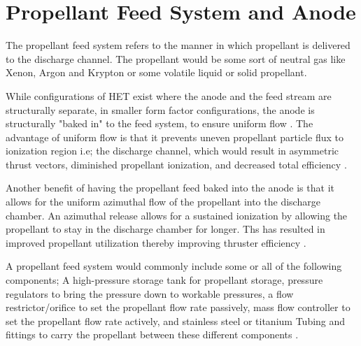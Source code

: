 \section{Propellant Feed System and Anode}

The propellant feed system refers to the manner in which propellant is delivered to the discharge channel. The propellant would be some sort of neutral gas like Xenon, Argon and Krypton or some volatile liquid or solid propellant.


While configurations of \ac{HET} exist where the anode and the feed stream are structurally separate, in smaller form factor configurations, the anode is structurally "baked in" to the feed system, to ensure uniform flow \cite{propfeedsys}. The advantage of uniform flow is that it prevents uneven propellant particle flux to ionization region i.e; the discharge channel, which would result in asymmetric thrust vectors, diminished propellant ionization, and decreased total efficiency \cite{propfeedsys}.


Another benefit of having the propellant feed baked into the anode is that it allows for the uniform azimuthal flow of the propellant into the discharge chamber. An azimuthal release allows for a sustained ionization by allowing the propellant to stay in the discharge chamber for longer. Ths has resulted in improved propellant utilization thereby improving thruster efficiency \cite{propfeedsys}.



A propellant feed system would commonly include some or all of the following components; A high-pressure storage tank for propellant storage, pressure regulators to bring the pressure down to workable pressures, a flow restrictor/orifice to set the propellant flow rate passively, mass flow controller to set the propellant flow rate actively, and stainless steel or titanium Tubing and fittings to carry the propellant between these different components \cite{propfeedsys}. 
